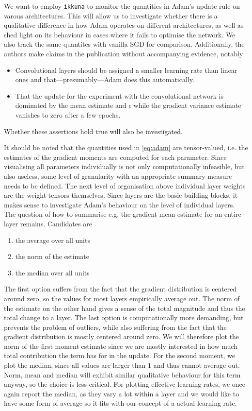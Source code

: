 We want to employ \texttt{ikkuna} to monitor the quantities in Adam's update
rule on varous architectures. This will allow us to investigate whether there is
a qualitative difference in how Adam operates on different architectures, as
well as shed light on its behaviour in cases where it fails to optimise the
network. We also track the same quantites with vanilla SGD for comparison.
Additionally, the authors make claims in the publication without accompanying
evidence, notably

\begin{itemize}
    \item \label{itm:adam-claim-1} Convolutional layers should be assigned a smaller learning rate than
        linear ones and that---presumably---Adam does this automatically.
    \item
        That the update for the experiment with the convolutional network is
        dominated by the mean estimate and $\epsilon$ while the gradient
        variance estimate vanishes to zero after a few epochs.
\end{itemize}
Whether these assertions hold true will also be investigated.

It should be noted that the quantities used in \cref{eq:adam} are tensor-valued,
i.e. the estimates of the gradient moments are computed for each parameter.
Since visualising all parameters individually is not only computationally
infeasible, but also useless, some level of granularity with an appropriate
summary measure needs to be defined. The next level of organisation above
individual layer weights are the weight tensors themselves. Since layers are the
basic building blocks, it makes sense to investigate Adam's behaviour on the
level of individual layers. The question of how to summarise e.g. the gradient
mean estimate for an entire layer remains. Candidates are
\begin{enumerate}
    \item the average over all units
    \item the norm of the estimate
    \item the median over all units
\end{enumerate}
The first option suffers from the fact that the gradient distribution is
centered around zero, so the values for most layers empirically average out.
The norm of the estimate on the other hand gives a sense of the total magnitude and thus the total
change to a layer. The last option is computationally more demanding, but
prevents the problem of outliers, while also suffering from the fact that the
gradient distribution is mostly centered around zero. We will therefore plot the
norm of the first moment estimate since we are mostly interested in how much
total contribution the term has for in the update. For the second moment, we
plot the median, since all values are larger than $1$ and thus cannot average
out. Norm, mean and median will exhibit similar qualitative behaviour for this
term anyway, so the choice is less critical. For plotting effective learning
rates, we once again report the median, as they vary a lot within a layer and we
would like to have some form of average so it fits with our concept of a
actual learning rate.

